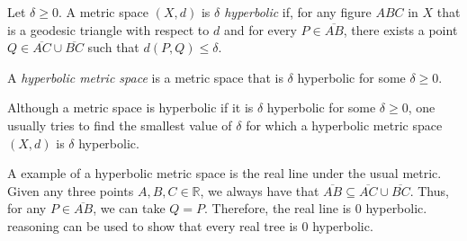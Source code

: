 \documentclass[12pt]{article}
\begin{document}
Let $\delta \ge 0$.  A metric space $(X,d)$ is \emph{$\delta$ hyperbolic} if, for any figure $ABC$ in $X$ that is a geodesic triangle with respect to $d$ and for every $P \in \overline{AB}$, there exists a point $Q \in \overline{AC} \cup \overline{BC}$ such that $d(P,Q) \le \delta$.

A \emph{hyperbolic metric space} is a metric space that is $\delta$ hyperbolic for some $\delta \ge 0$.

Although a metric space is hyperbolic if it is $\delta$ hyperbolic for some $\delta \ge 0$, one usually tries to find the smallest value of $\delta$ for which a hyperbolic metric space $(X,d)$ is $\delta$ hyperbolic.

A  example of a hyperbolic metric space is the real line under the usual metric.  Given any three points $A,B,C \in \mathbb{R}$, we always have that $\overline{AB} \subseteq \overline{AC} \cup \overline{BC}$.  Thus, for any $P \in \overline{AB}$, we can take $Q=P$.  Therefore, the real line is 0 hyperbolic.   reasoning can be used to show that every real tree is 0 hyperbolic.
\end{document}
